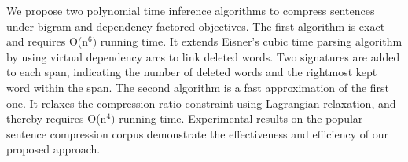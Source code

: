 We propose two polynomial time inference algorithms to compress sentences under bigram and dependency-factored objectives. The first algorithm is exact and requires O(n$^6)$ running time. It extends Eisner's cubic time parsing algorithm by using virtual dependency arcs to link deleted words. Two signatures are added to each span, indicating the number of deleted words and the rightmost kept word within the span. The second algorithm is a fast approximation of the first one. It relaxes the compression ratio constraint using Lagrangian relaxation, and thereby requires O(n$^4)$ running time. Experimental results on the popular sentence compression corpus demonstrate the effectiveness and efficiency of our proposed approach.
